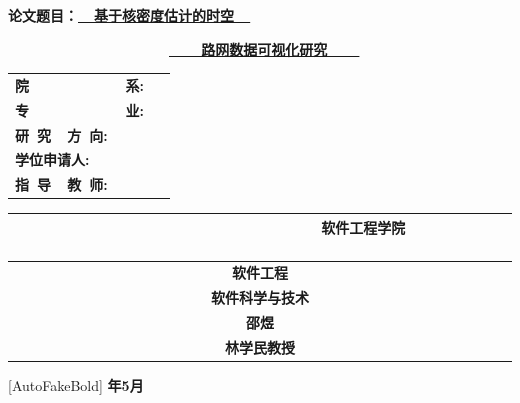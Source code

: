 \vspace{0.5cm}

\begin{center}

	{\yihao \bf {论文题目：\underline{~~基于核密度估计的时空~~}}}

	\vspace{0.8cm}

	{\yihao \bf {\ \ \ \ \ \ \ \ \ \ \ \ \ \ \ \ \ \ \ \ \underline{~~~~路网数据可视化研究~~~~}}}
\end{center}

\vspace{1.6cm}

\begin{center}
	\renewcommand\arraystretch{1.7}
	\begin{tabular}{l}
		{\sihao \bf 院~~~~~~~~~~~~系:} \\
		{\sihao \bf 专~~~~~~~~~~~~业:} \ \      \\
		{\sihao \bf 研~究~~方~向:} \ \     \\
		{\sihao \bf 学位申请人:} \ \      \\
		{\sihao \bf 指~导~~教~师:}
	\end{tabular}
	\begin{tabular}{c}

		{\sihao \bf  ~~~~~~~~~~~~~~~~~~~~~~~~~ 软件工程学院 ~~~~~~~~~~~~~~~~~~~~~~~~~ } \\
		\hline {\sihao \bf 软件工程}                  \\
		\hline {\sihao \bf 软件科学与技术}                 \\
		\hline {\sihao \bf 邵煜}                     \\
		\hline {\sihao \bf 林学民教授}                     \\


		\hline
	\end{tabular}
\end{center}

\vspace{1cm}

\begin{center}
	[AutoFakeBold]
	{\fontsize{14pt}{21pt}\selectfont \bf {}年{5}月}
\end{center}

\cleardoublepage
